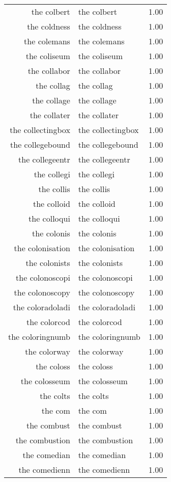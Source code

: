 \begin{table}[ht]
\begin{tabular}{rlr}
  the colbert & the colbert & 1.00 \\ 
  the coldness & the coldness & 1.00 \\ 
  the colemans & the colemans & 1.00 \\ 
  the coliseum & the coliseum & 1.00 \\ 
  the collabor & the collabor & 1.00 \\ 
  the collag & the collag & 1.00 \\ 
  the collage & the collage & 1.00 \\ 
  the collater & the collater & 1.00 \\ 
  the collectingbox & the collectingbox & 1.00 \\ 
  the collegebound & the collegebound & 1.00 \\ 
  the collegeentr & the collegeentr & 1.00 \\ 
  the collegi & the collegi & 1.00 \\ 
  the collis & the collis & 1.00 \\ 
  the colloid & the colloid & 1.00 \\ 
  the colloqui & the colloqui & 1.00 \\ 
  the colonis & the colonis & 1.00 \\ 
  the colonisation & the colonisation & 1.00 \\ 
  the colonists & the colonists & 1.00 \\ 
  the colonoscopi & the colonoscopi & 1.00 \\ 
  the colonoscopy & the colonoscopy & 1.00 \\ 
  the coloradoladi & the coloradoladi & 1.00 \\ 
  the colorcod & the colorcod & 1.00 \\ 
  the coloringnumb & the coloringnumb & 1.00 \\ 
  the colorway & the colorway & 1.00 \\ 
  the coloss & the coloss & 1.00 \\ 
  the colosseum & the colosseum & 1.00 \\ 
  the colts & the colts & 1.00 \\ 
  the com & the com & 1.00 \\ 
  the combust & the combust & 1.00 \\ 
  the combustion & the combustion & 1.00 \\ 
  the comedian & the comedian & 1.00 \\ 
  the comedienn & the comedienn & 1.00 \\ 

\end{tabular}
\end{table}
